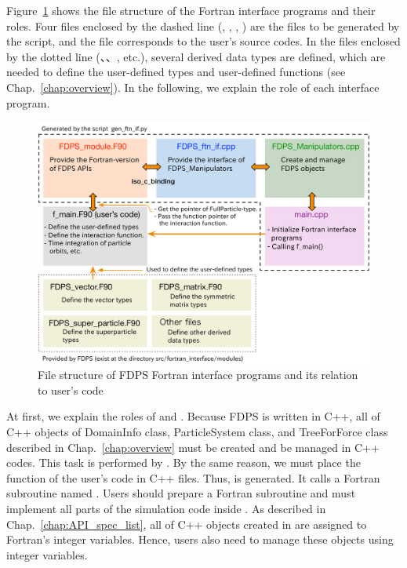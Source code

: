 Figure~\ref{fig:FDPS_ftn_if_file_str} shows the file structure of the Fortran interface programs and their roles. Four files enclosed by the dashed line (, , , ) are the files to be generated by the script, and the file  corresponds to the user's source codes. In the files enclosed by the dotted line (、、, etc.), several derived data types are defined, which are needed to define the user-defined types and user-defined functions (see Chap.~\ref{chap:overview}). In the following, we explain the role of each interface program.

\begin{figure}[h]
\centering
\includegraphics[width=\linewidth]{./fig/FDPS_ftn_if_file_str.pdf}
\caption{File structure of FDPS Fortran interface programs and its relation to user's code}
\label{fig:FDPS_ftn_if_file_str}
\end{figure}

At first, we explain the roles of  and . Because FDPS is written in C++, all of C++ objects of DomainInfo class, ParticleSystem class, and TreeForForce class described in Chap.~\ref{chap:overview} must be created and be managed in C++ codes. This task is performed by . By the same reason, we must place the  function of the user's code in C++ files. Thus,  is generated. It calls a Fortran subroutine named . Users should prepare a Fortran subroutine  and must implement all parts of the simulation code inside . As described in Chap.~\ref{chap:API_spec_list}, all of C++ objects created in  are assigned to Fortran's integer variables. Hence, users also need to manage these objects using integer variables.

